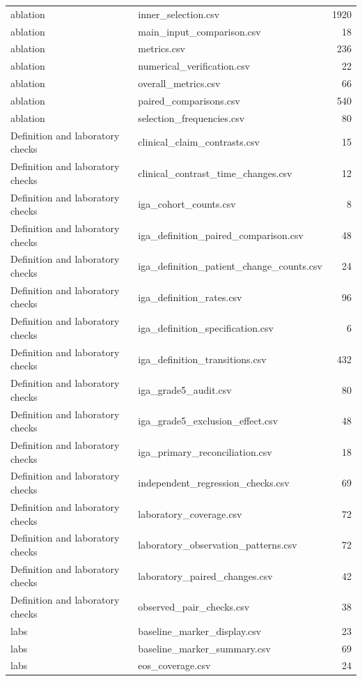 \begin{longtable}{p{20mm}p{115mm}r}
ablation & inner\_selection.csv & 1920 \\
ablation & main\_input\_comparison.csv & 18 \\
ablation & metrics.csv & 236 \\
ablation & numerical\_verification.csv & 22 \\
ablation & overall\_metrics.csv & 66 \\
ablation & paired\_comparisons.csv & 540 \\
ablation & selection\_frequencies.csv & 80 \\
Definition and laboratory checks & clinical\_claim\_contrasts.csv & 15 \\
Definition and laboratory checks & clinical\_contrast\_time\_changes.csv & 12 \\
Definition and laboratory checks & iga\_cohort\_counts.csv & 8 \\
Definition and laboratory checks & iga\_definition\_paired\_comparison.csv & 48 \\
Definition and laboratory checks & iga\_definition\_patient\_change\_counts.csv & 24 \\
Definition and laboratory checks & iga\_definition\_rates.csv & 96 \\
Definition and laboratory checks & iga\_definition\_specification.csv & 6 \\
Definition and laboratory checks & iga\_definition\_transitions.csv & 432 \\
Definition and laboratory checks & iga\_grade5\_audit.csv & 80 \\
Definition and laboratory checks & iga\_grade5\_exclusion\_effect.csv & 48 \\
Definition and laboratory checks & iga\_primary\_reconciliation.csv & 18 \\
Definition and laboratory checks & independent\_regression\_checks.csv & 69 \\
Definition and laboratory checks & laboratory\_coverage.csv & 72 \\
Definition and laboratory checks & laboratory\_observation\_patterns.csv & 72 \\
Definition and laboratory checks & laboratory\_paired\_changes.csv & 42 \\
Definition and laboratory checks & observed\_pair\_checks.csv & 38 \\
labs & baseline\_marker\_display.csv & 23 \\
labs & baseline\_marker\_summary.csv & 69 \\
labs & eos\_coverage.csv & 24 \\

\end{longtable}
